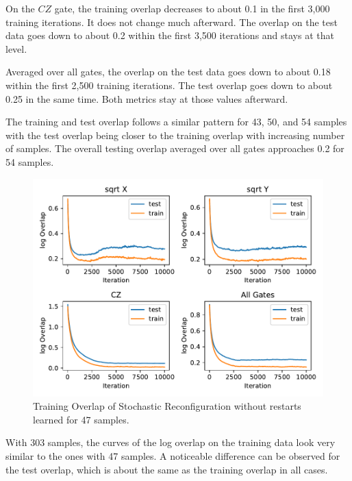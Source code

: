 On the $CZ$ gate, the training overlap decreases to about 0.1 in the first 3,000 training iterations. It does 
not change much afterward. The overlap on the test data goes down to about 0.2 within the first 3,500 iterations 
and stays at that level.

Averaged over all gates, the overlap on the test data goes down to about 0.18 within the first 2,500 training iterations. 
The test overlap goes down to about 0.25 in the same time. Both metrics stay at those values afterward.

The training and test overlap follows a similar pattern for 43, 50, and 54 samples with the 
test overlap being closer to the training overlap with increasing number of samples. The overall
testing overlap averaged over all gates approaches 0.2 for 54 samples.

\begin{figure}[H]
  \centering
  \includegraphics[width=\textwidth]{figures/results/SR-no-restarts-learned/avgOverlap_47.pdf}
  \caption[Training overlap of Stochastic Reconfiguration without restarts learned]{Training 
  Overlap of Stochastic Reconfiguration without restarts learned for 47 samples.}
  \label{fig:sr_no_restarts_overlap_47}
\end{figure}

With 303 samples, the curves of the log overlap on the training data look very similar to the 
ones with 47 samples. A noticeable difference can be observed for the test overlap, which is 
about the same as the training overlap in all cases.

